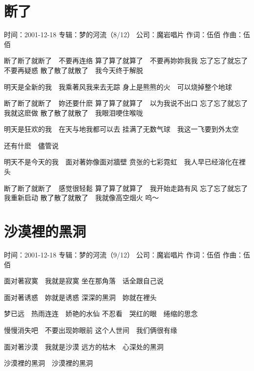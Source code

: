 \documentclass[UTF8,a4paper,oneside,twocolumn,12pt]{ctexbook}
\newcommand{\infopair}[2]{\textbullet #1：#2}
\newcommand{\zc}[1][伍佰]{\infopair{作词}{#1}}
\newcommand{\zq}[1][伍佰]{\infopair{作曲}{#1}}
\newcommand{\zj}[1]{\infopair{专辑}{#1}}
\newcommand{\sj}[1]{\infopair{时间}{#1}}
\newcommand{\gs}[1]{\infopair{公司}{#1}}
\newenvironment{info}{\begin{flushleft}\kaishu
	}
	{\end{flushleft}\normalsize\yahei\par}
\newenvironment{lyric}{
	}
{}
\begin{document}
\section{断了}
\begin{info}
	\sj{2001-12-18}
	\zj{梦的河流（8/12）}
	\gs{魔岩唱片}
	\zc
	\zq
\end{info}
\begin{lyric}
	断了断了就断了　不要再连络
	算了算了就算了　不要再妳妳我我
	忘了忘了就忘了　不要再疑惑
	散了散了就散了　我今天终于解脱

	明天是全新的我　我乘著风我来去无踪
	身上是熊熊的火　可以烧掉整个地球

	断了断了就断了　妳还要什麽
	算了算了就算了　以为我说不出口
	忘了忘了就忘了　我就这麽做
	散了散了就散了　我眼泪哽住喉咙

	明天是狂欢的我　在天与地我都可以去
	挂满了无数气球　我这一飞要到外太空

	还有什麽　儘管说

	明天不是今天的我　面对著妳像面对牆壁
	贲张的七彩霓虹　我人早已经溶化在裡头

	断了断了就断了　感觉很轻鬆
	算了算了就算了　我开始走路有风
	忘了忘了就忘了　我重新启动
	散了散了就散了　我就像高空烟火
	呜～
\end{lyric}

\section{沙漠裡的黑洞}
\begin{info}
	\sj{2001-12-18}
	\zj{梦的河流（9/12）}
	\gs{魔岩唱片}
	\zc
	\zq
\end{info}
\begin{lyric}
	面对著寂寞　我就是寂寞
	坐在那角落　话全跟自己说

	面对著诱惑　妳就是诱惑
	深深的黑洞　妳就在裡头

	梦已远　热雨连连　娇艳的水仙
	不忍看　哭红的眼　绻缩的思念

	慢慢消失吧　不要出现妳眼前
	这个人世间　我们俩很有缘

	面对著沙漠　我就是沙漠
	远方的枯木　心深处的黑洞

	沙漠裡的黑洞　沙漠裡的黑洞
\end{lyric}
\end{document}
